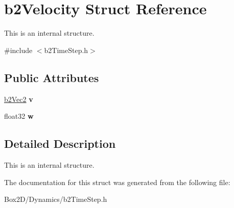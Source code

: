 \hypertarget{structb2_velocity}{}\section{b2\+Velocity Struct Reference}
\label{structb2_velocity}


This is an internal structure.  




{\ttfamily \#include $<$b2\+Time\+Step.\+h$>$}

\subsection*{Public Attributes}
\begin{DoxyCompactItemize}
\item 
\mbox{\label{structb2_velocity_a73b92ceff532491e71b9dbc53eecaa70}} 
\hyperlink{structb2_vec2}{b2\+Vec2} {\bfseries v}
\item 
\mbox{\label{structb2_velocity_a6ce6f6c83ceb95100532d3f2b0485b83}} 
float32 {\bfseries w}
\end{DoxyCompactItemize}


\subsection{Detailed Description}
This is an internal structure. 

The documentation for this struct was generated from the following file\+:\begin{DoxyCompactItemize}
\item 
Box2\+D/\+Dynamics/b2\+Time\+Step.\+h\end{DoxyCompactItemize}
